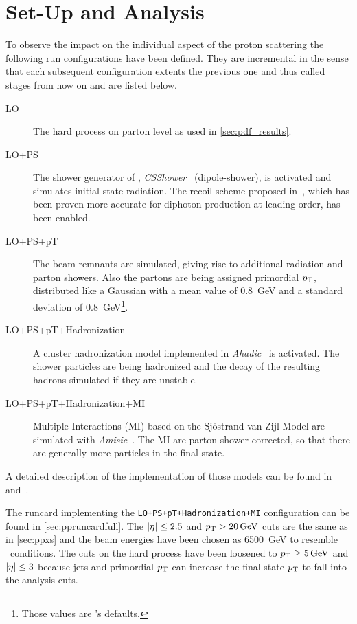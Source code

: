 \section{Set-Up and Analysis}%
\label{sec:setupan}

To observe the impact on the individual aspect of the proton
scattering the following run configurations have been defined. They
are incremental in the sense that each subsequent configuration
extents the previous one and thus called stages from now on and are
listed below.
%
\begin{description}
\item[LO] The hard process on parton level as used in \cref{sec:pdf_results}.
\item[LO+PS] The shower generator of \sherpa,
  \emph{CSShower}~\cite{schumann2008:ap} (dipole-shower), is activated and
  simulates initial state radiation. The recoil scheme proposed
  in~\cite{hoeche2009:ha}, which has been proven more accurate for
  diphoton production at leading order, has been enabled.
\item[LO+PS+pT] The beam remnants are simulated, giving rise to
  additional radiation and parton showers.  Also the partons are being
  assigned primordial \(p_\mathrm{T}\), distributed like a Gaussian with a mean
  value of \SI{.8}{\giga\electronvolt} and a standard deviation of
  \SI{.8}{\giga\electronvolt}\footnote{Those values are \sherpa 's
    defaults.}.
\item[LO+PS+pT+Hadronization] A cluster hadronization model
  implemented in \emph{Ahadic}~\cite{Winter2003:tt} is
  activated. The shower particles are being hadronized and the decay
  of the resulting hadrons simulated if they are unstable.
\item[LO+PS+pT+Hadronization+MI] Multiple Interactions (MI) based on
  the Sj\"ostrand-van-Zijl Model are simulated with
  \emph{Amisic}~\cite{Bothmann:2019yzt}. The MI are parton shower
  corrected, so that there are generally more particles in the final
  state.
\end{description}
%
A detailed description of the implementation of those models can be
found in~\cite{Gleisberg:2008ta} and~\cite{Bothmann:2019yzt}.

The runcard implementing the \texttt{LO+PS+pT+Hadronization+MI}
configuration can be found in \cref{sec:ppruncardfull}. The
\(\abs{\eta}\leq 2.5\) and \(p_\mathrm{T} > \SI{20}{\giga\electronvolt}\) cuts
are the same as in \cref{sec:ppxs} and the beam energies have been
chosen as \SI{6500}{\giga\electronvolt} to resemble \lhc\ conditions.
The cuts on the hard process have been loosened to
\(p_\mathrm{T} \geq \SI{5}{\giga\electronvolt}\) and \(\abs{\eta}\leq 3\)
because jets and primordial \(p_\mathrm{T}\) can increase the final state
\(p_\mathrm{T}\) to fall into the analysis cuts.

